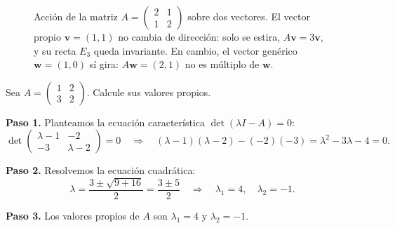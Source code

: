 \begin{figure}[!htbp]
\centering
{}
\caption{Acción de la matriz $A=\left(\begin{smallmatrix}2&1\\1&2\end{smallmatrix}\right)$ sobre dos vectores. El vector propio $\mathbf{v}=(1,1)$ no cambia de dirección: solo se estira, $A\mathbf{v}=3\mathbf{v}$, y su recta $E_{3}$ queda invariante. En cambio, el vector genérico $\mathbf{w}=(1,0)$ sí gira: $A\mathbf{w}=(2,1)$ no es múltiplo de $\mathbf{w}$.}
\label{fig:accion_vector_propio}
\end{figure}

\begin{example}\label{ex:ejemplovvp}
	Sea $A = \begin{pmatrix} 1 & 2 \\ 3 & 2 \end{pmatrix}$. Calcule sus valores propios.
	\begin{myproof}
	\textbf{Paso 1.} Planteamos la ecuación característica $\det(\lambda I - A)=0$:
	\[
	\det\begin{pmatrix} \lambda - 1 & -2 \\ -3 & \lambda - 2 \end{pmatrix} = 0 \quad\Rightarrow\quad (\lambda-1)(\lambda-2)-(-2)(-3)=\lambda^2-3\lambda-4=0.
	\]

	\textbf{Paso 2.} Resolvemos la ecuación cuadrática:
	\[
	\lambda = \frac{3 \pm \sqrt{9+16}}{2} = \frac{3 \pm 5}{2} \quad\Rightarrow\quad \lambda_1 = 4, \quad \lambda_2 = -1.
	\]

	\textbf{Paso 3.} Los valores propios de $A$ son $\boxed{\lambda_1=4 \text{ y } \lambda_2=-1}$.
\end{myproof}

\end{example}

